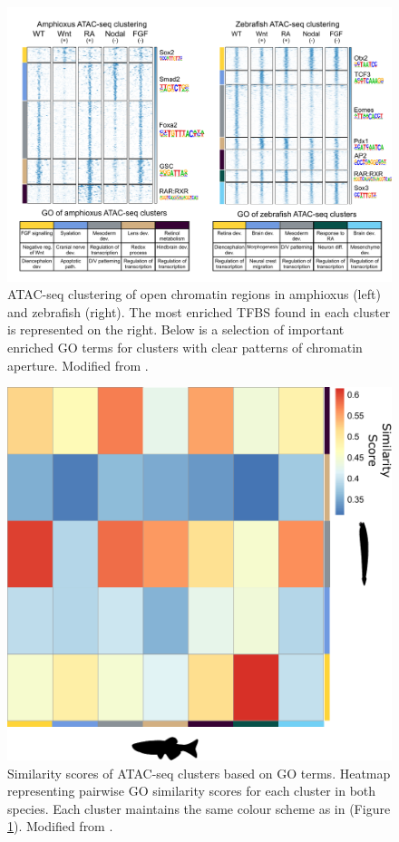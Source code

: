 \begin{figure}[hp]
\centering
\includegraphics[width=1\textwidth]{Figures/ATACseq_clustering.pdf}
\caption[ATAC-seq clustering of open chromatin regions]{ATAC-seq clustering of open chromatin regions in amphioxus (left) and zebrafish (right). The most enriched TFBS found in each cluster is represented on the right. Below is a selection of important enriched GO terms for clusters with clear patterns of chromatin aperture. Modified from \parencite{gil-galvez_gain_2022}. 
}
\label{fig:ATACseq_clustering}
\end{figure} 

\begin{figure}[hp]
\centering
\includegraphics[width=1\textwidth]{Figures/ATAC_go_similar}
\caption[Similarity of ATAC-seq clusters based on GO terms]{
Similarity scores of ATAC-seq clusters based on GO terms. Heatmap representing pairwise GO similarity scores for each cluster in both species. Each cluster maintains the same colour scheme as in (Figure \ref{fig:ATACseq_clustering}). Modified from \parencite{gil-galvez_gain_2022}.
}
\label{fig:ATAC_go_similar}
\end{figure} 

